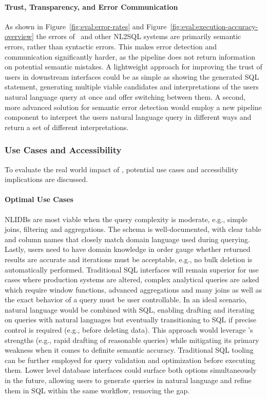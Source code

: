 \paragraph{Trust, Transparency, and Error Communication}

As shown in Figure~\ref{fig:eval:error-rates} and
Figure~\ref{fig:eval:execution-accuracy-overview} the errors of \Natural~and other
NL2SQL systems are primarily semantic errors, rather than syntactic errors.
This makes error detection and communication significantly harder, as the
pipeline does not return information on potential semantic mistakes. A
lightweight approach for improving the trust of users in downstream interfaces
could be as simple as showing the generated SQL statement, generating
multiple viable candidates and interpretations of the users natural language
query at once and offer switching between them. A second, more advanced
solution for semantic error detection would employ a new pipeline component to
interpret the users natural language query in different ways and return a set
of different interpretations.

\subsubsection{Use Cases and Accessibility}

To evaluate the real world impact of \Natural, potential use cases and
accessibility implications are discussed.

\paragraph{Optimal Use Cases}

NLIDBs are most viable when the query complexity is moderate, e.g., simple
joins, filtering and aggregations. The schema is well-documented, with clear
table and column names that closely match domain language used during querying.
Lastly, users need to have domain knowledge in order gauge whether returned
results are accurate and iterations must be acceptable, e.g., no bulk deletion
is automatically performed. Traditional SQL interfaces will remain superior for
use cases where production systems are altered, complex analytical queries are
asked which require window functions, advanced aggregations and many joins as
well as the exact behavior of a query must be user controllable. In an ideal
scenario, natural language would be combined with SQL, enabling drafting and
iterating on queries with natural languages but eventually transitioning to SQL
if precise control is required (e.g., before deleting data). This approach
would leverage \Natural's strengths (e.g., rapid drafting of reasonable
queries) while mitigating its primary weakness when it comes to definite
semantic accuracy. Traditional SQL tooling can be further employed for query
validation and optimization before executing them. Lower level database
interfaces could surface both options simultaneously in the future, allowing
users to generate queries in natural language and refine them in SQL within the
same workflow, removing the gap.

